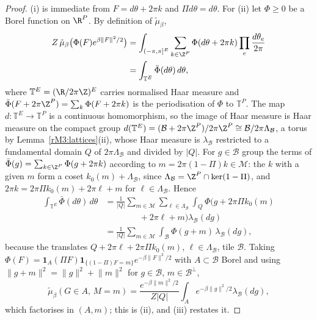 \begin{proof}
(i) is immediate from $F=d\theta+2\pi k$ and $\Pi d\theta=d\theta$.
For (ii) let $\Phi\ge0$ be a Borel function on $\R^P$. By definition of
$\tilde\mu_\beta$,
\begin{align*}
Z\,\tilde\mu_\beta\bigl(\Phi(F)e^{\beta\lVert F\rVert^2/2}\bigr)
&=\int_{(-\pi,\pi]^E}\sum_{k\in\Z^P}\Phi(d\theta+2\pi k)\prod_e\frac{d\theta_e}
{2\pi}\\
&=\int_{\mathbb T^E}\bar\Phi(d\theta)\,d\theta,
\end{align*}
where $\mathbb T^E=(\R/2\pi\Z)^E$ carries normalised Haar measure and
$\bar\Phi(F+2\pi\Z^P)=\sum_k\Phi(F+2\pi k)$ is the periodisation of $\Phi$
to $\mathbb T^P$. The map $d:\mathbb T^E\to\mathbb T^P$ is a continuous
homomorphism, so the image of Haar measure is Haar measure on the compact
group $d(\mathbb T^E)=(\mathcal B+2\pi\Z^P)/2\pi\Z^P\cong\mathcal B/2\pi
\Lambda_{\mathcal B}$, a torus by Lemma~\ref{rM3:lattices}(ii), whose Haar
measure is $\lambda_{\mathcal B}$ restricted to a fundamental domain
$Q$ of $2\pi\Lambda_{\mathcal B}$ and divided by $\lvert Q\rvert$. For
$g\in\mathcal B$ group the terms of $\bar\Phi(g)=\sum_{k\in\Z^P}\Phi(g+2\pi
k)$ according to $m=2\pi(1-\Pi)k\in\mathcal M$: the $k$ with a given $m$
form a coset $k_0(m)+\Lambda_{\mathcal B}$, since $\Lambda_{\mathcal B}
=\Z^P\cap\ker(1-\Pi)$, and $2\pi k=2\pi\Pi k_0(m)+2\pi\ell+m$ for $\ell\in
\Lambda_{\mathcal B}$. Hence
\begin{align*}
\int_{\mathbb T^E}\bar\Phi(d\theta)\,d\theta&=\frac1{\lvert Q\rvert}
\sum_{m\in\mathcal M}\sum_{\ell\in\Lambda_{\mathcal B}}\int_Q\Phi\bigl(g+2\pi
\Pi k_0(m)\\
&\qquad\qquad+2\pi\ell+m\bigr)\lambda_{\mathcal B}(dg)\\
&=\frac1{\lvert Q\rvert}
\sum_{m\in\mathcal M}\int_{\mathcal B}\Phi(g+m)\,\lambda_{\mathcal B}(dg),
\end{align*}
because the translates $Q+2\pi\ell+2\pi\Pi k_0(m)$, $\ell\in\Lambda_{\mathcal
B}$, tile $\mathcal B$. Taking $\Phi(F)=\mathbf 1_A(\Pi F)\mathbf 1_{\{(1-\Pi)F=m
\}}e^{-\beta\lVert F\rVert^2/2}$ with $A\subset\mathcal B$ Borel and using
$\lVert g+m\rVert^2=\lVert g\rVert^2+\lVert m\rVert^2$ for $g\in\mathcal
B$, $m\in\mathcal B^\perp$,
\[
\tilde\mu_\beta(G\in A,\,M=m)=\frac{e^{-\beta\lVert m\rVert^2/2}}{Z\lvert Q
\rvert}\int_Ae^{-\beta\lVert g\rVert^2/2}\lambda_{\mathcal B}(dg),
\]
which factorises in $(A,m)$; this is (ii), and (iii) restates it.
\end{proof}

